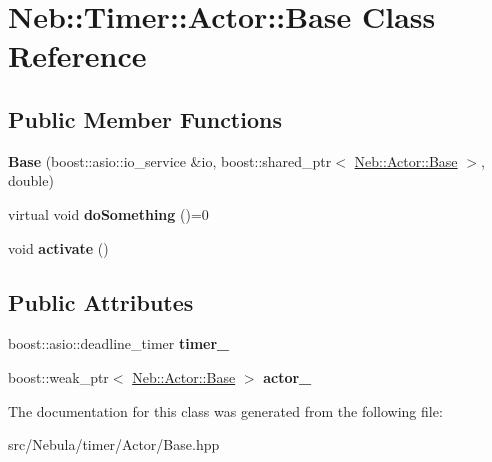\hypertarget{classNeb_1_1Timer_1_1Actor_1_1Base}{\section{\-Neb\-:\-:\-Timer\-:\-:\-Actor\-:\-:\-Base \-Class \-Reference}
\label{classNeb_1_1Timer_1_1Actor_1_1Base}
}
\subsection*{\-Public \-Member \-Functions}
\begin{DoxyCompactItemize}
\item 
\hypertarget{classNeb_1_1Timer_1_1Actor_1_1Base_abf4fc9cbf5d86bd2c36da3a9d10f262d}{{\bfseries \-Base} (boost\-::asio\-::io\-\_\-service \&io, boost\-::shared\-\_\-ptr$<$ \hyperlink{classNeb_1_1Actor_1_1Base}{\-Neb\-::\-Actor\-::\-Base} $>$, double)}\label{classNeb_1_1Timer_1_1Actor_1_1Base_abf4fc9cbf5d86bd2c36da3a9d10f262d}

\item 
\hypertarget{classNeb_1_1Timer_1_1Actor_1_1Base_a8e1f81941a3720f925aa376ef2c260e0}{virtual void {\bfseries do\-Something} ()=0}\label{classNeb_1_1Timer_1_1Actor_1_1Base_a8e1f81941a3720f925aa376ef2c260e0}

\item 
\hypertarget{classNeb_1_1Timer_1_1Actor_1_1Base_a698df59a0dc7ebb6a8f0a0dfc45f2004}{void {\bfseries activate} ()}\label{classNeb_1_1Timer_1_1Actor_1_1Base_a698df59a0dc7ebb6a8f0a0dfc45f2004}

\end{DoxyCompactItemize}
\subsection*{\-Public \-Attributes}
\begin{DoxyCompactItemize}
\item 
\hypertarget{classNeb_1_1Timer_1_1Actor_1_1Base_a901f924d54f4d8c44244586a270df37e}{boost\-::asio\-::deadline\-\_\-timer {\bfseries timer\-\_\-}}\label{classNeb_1_1Timer_1_1Actor_1_1Base_a901f924d54f4d8c44244586a270df37e}

\item 
\hypertarget{classNeb_1_1Timer_1_1Actor_1_1Base_a365e4320c4de0c27fc7518a4e1e09f8e}{boost\-::weak\-\_\-ptr$<$ \hyperlink{classNeb_1_1Actor_1_1Base}{\-Neb\-::\-Actor\-::\-Base} $>$ {\bfseries actor\-\_\-}}\label{classNeb_1_1Timer_1_1Actor_1_1Base_a365e4320c4de0c27fc7518a4e1e09f8e}

\end{DoxyCompactItemize}


\-The documentation for this class was generated from the following file\-:\begin{DoxyCompactItemize}
\item 
src/\-Nebula/timer/\-Actor/\-Base.\-hpp\end{DoxyCompactItemize}

